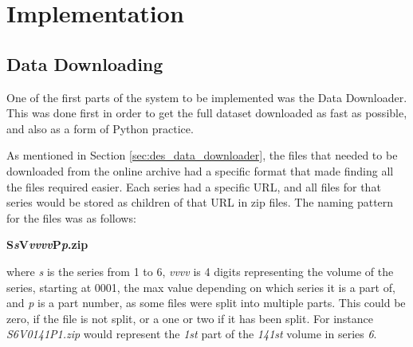 \chapter{Implementation}

%

	
\section{Data Downloading}
\label{sec:imp_data_download}
One of the first parts of the system to be implemented was the Data Downloader. This was done first in order to get the full dataset downloaded as fast as possible, and also as a form of Python practice.

As mentioned in Section \ref{sec:des_data_downloader}, the files that needed to be downloaded from the online archive had a specific format that made finding all the files required easier. Each series had a specific URL, and all files for that series would be stored as children of that URL in zip files. The naming pattern for the files was as follows:

\textbf{S\emph{s}V\emph{vvvv}P\emph{p}.zip}

where \emph{s} is the series from 1 to 6, \emph{vvvv} is 4 digits representing the volume of the series, starting at 0001, the max value depending on which series it is a part of, and \emph{p} is a part number, as some files were split into multiple parts. This could be zero, if the file is not split, or a one or two if it has been split. For instance \emph{S6V0141P1.zip} would represent the \emph{1st} part of the \emph{141st} volume in series \emph{6}.

